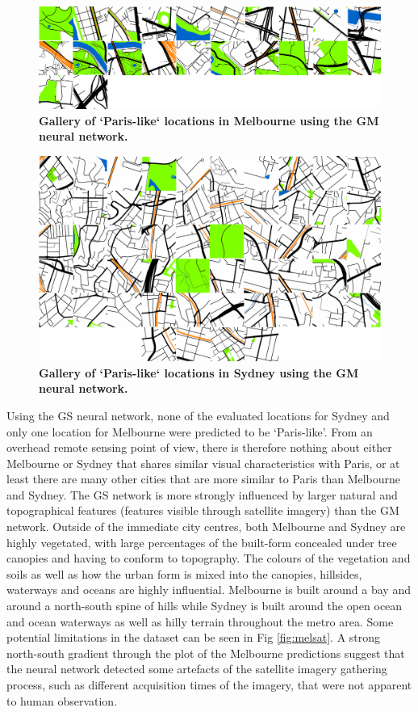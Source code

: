 \documentclass[Crown,sageh,times]{sagej}
\begin{document}
\begin{figure}[!htbp]
\centering   
\includegraphics[scale=0.19]{Images/PlosOne/Fig10.png}   
\caption{\bf Gallery of `Paris-like` locations in Melbourne using the GM neural network.}    
 \label{fig:gm_mel_gallery} 
\end{figure} 


\begin{figure}[!htbp]
\centering   
\includegraphics[scale=0.19]{Images/PlosOne/Fig11.png}   
\caption{\bf Gallery of `Paris-like` locations in Sydney using the GM neural network.}    
 \label{fig:gm_syd_gallery}  
\end{figure} 

Using the GS neural network, none of the evaluated locations for Sydney and only one location for Melbourne were predicted to be `Paris-like'. From an overhead remote sensing point of view, there is therefore nothing about either Melbourne or Sydney that shares similar visual characteristics with Paris, or at least there are many other cities that are more similar to Paris than Melbourne and Sydney. The GS network is more strongly influenced by larger natural and topographical features (features visible through satellite imagery) than the GM network. Outside of the immediate city centres, both Melbourne and Sydney are highly vegetated, with large percentages of the built-form concealed under tree canopies and having to conform to topography. The colours of the vegetation and soils as well as how the urban form is mixed into the canopies, hillsides, waterways and oceans are highly influential. Melbourne is built around a bay and around a north-south spine of hills while Sydney is built around the open ocean and ocean waterways as well as hilly terrain throughout the metro area. Some potential limitations in the dataset can be seen in Fig \ref{fig:melsat}. A strong north-south gradient through the plot of the Melbourne predictions suggest that the neural network detected some artefacts of the satellite imagery gathering process, such as different acquisition times of the imagery, that were not apparent to human observation. 
\end{document}
